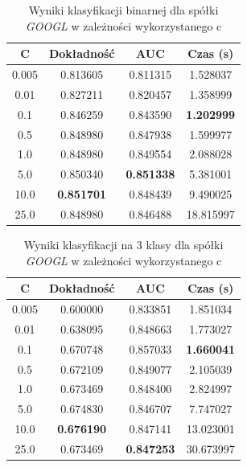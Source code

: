 \documentclass[a4paper, twoside, 11pt, openright]{article}
\begin{document}
\begin{table}[H]
    \centering
    \begin{tabular}{|c|c|c|c|}
    \hline
        \textbf{C} & \textbf{Dokładność} & \textbf{AUC} & \textbf{Czas (s)} \\ \hline
0.005 &  0.813605 &  0.811315 &    1.528037 \\ \hline
0.01  &  0.827211 &  0.820457 &    1.358999 \\ \hline
0.1   &  0.846259 &  0.843590 &    \textbf{1.202999} \\ \hline
0.5   &  0.848980 &  0.847938 &    1.599977 \\ \hline
1.0   &  0.848980 &  0.849554 &    2.088028 \\ \hline
5.0   &  0.850340 &  \textbf{0.851338} &    5.381001 \\ \hline
10.0  &  \textbf{0.851701} &  0.848439 &    9.490025 \\ \hline
25.0  &  0.848980 &  0.846488 &   18.815997 \\ \hline
    \end{tabular}
    \caption{Wyniki klasyfikacji binarnej dla spółki \textit{GOOGL} w zależności wykorzystanego c}
    \label{tab:svm_c_binary}
\end{table}


\begin{table}[H]
    \centering
    \begin{tabular}{|c|c|c|c|}
    \hline
        \textbf{C} & \textbf{Dokładność} & \textbf{AUC} & \textbf{Czas (s)} \\ \hline
0.005 &  0.600000 &  0.833851 &    1.851034 \\ \hline
0.01  &  0.638095 &  0.848663 &    1.773027 \\ \hline
0.1   &  0.670748 &  0.857033 &    \textbf{1.660041} \\ \hline
0.5   &  0.672109 &  0.849077 &    2.105039 \\ \hline
1.0   &  0.673469 &  0.848400 &    2.824997 \\ \hline
5.0   &  0.674830 &  0.846707 &    7.747027 \\ \hline
10.0  &  \textbf{0.676190} &  0.847141 &   13.023001 \\ \hline
25.0  &  0.673469 &  \textbf{0.847253} &   30.673997 \\ \hline
    \end{tabular}
    \caption{Wyniki klasyfikacji na 3 klasy dla spółki \textit{GOOGL} w zależności wykorzystanego c}
\end{table}
    
\end{document}
